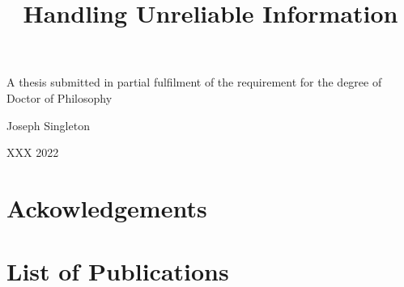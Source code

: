 \documentclass[a4paper,11pt,oneside]{memoir}
\title{
    Handling Unreliable Information
}
\begin{document}
\begin{titlingpage}

    \begin{center}
        {\HUGE\bfseries \thetitle}
        \par
        \vspace{2cm}
        {\Large A thesis submitted in partial fulfilment of the requirement for the
        degree of Doctor of Philosophy}
        \par
        \vspace{2cm}
        {\LARGE Joseph Singleton}
        \par
        \vspace{10cm}
        {\Large XXX 2022}
    \end{center}

    \clearpage

    \begin{abstract}
        
    \end{abstract}

\end{titlingpage}

\frontmatter
\tableofcontents

\clearpage

\chapter*{Ackowledgements}


\chapter*{List of Publications}


\mainmatter

\printbibliography
\appendix

\end{document}
